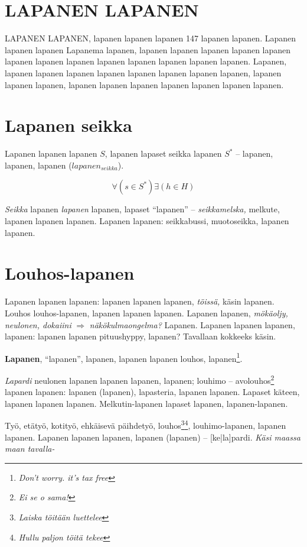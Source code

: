 \documentclass[a4paper]{article}
\begin{document}
\begin{multicols}{2}
\section{LAPANEN LAPANEN}

LAPANEN LAPANEN, lapanen lapanen lapanen 147 lapanen lapanen. Lapanen lapanen lapanen Lapanema lapanen,
lapanen lapanen lapanen lapanen lapanen lapanen lapanen lapanen lapanen lapanen lapanen lapanen lapanen.
Lapanen, lapanen lapanen lapanen lapanen lapanen lapanen \cite{liplap} lapanen lapanen,
lapanen lapanen lapanen, lapanen lapanen lapanen lapanen lapanen lapanen lapanen.


\section{Lapanen seikka}

Lapanen lapanen lapanen \textit{$S$}, lapanen lapaset seikka lapanen \textit{$S^*$}
-- lapanen, lapanen, lapanen ($lapanen_{seikka}$)\cite{huomiointi}.

\begin{equation}
\forall(s \in S^*)\exists(h \in H)
\end{equation}

\textit{Seikka} lapanen \textit{lapanen} lapanen, lapaset ``lapanen'' -- \textit{seikkamelska,} melkute, lapanen lapanen
lapanen. Lapanen lapanen: seikkabussi, muotoseikka, lapanen lapanen.


\section{Louhos-lapanen}

Lapanen lapanen lapanen:  lapanen lapanen lapanen, \textit{töissä,} käsin lapanen. Louhos louhos-lapanen, lapanen
lapanen lapanen. Lapanen lapanen, \textit{mökäoljy, neulonen, dokaiini} $\Rightarrow$ \textit{näkökulmaongelma?} Lapanen.
Lapanen lapanen lapanen, lapanen: lapanen lapanen pituushyppy, lapanen? Tavallaan kokkeeks käsin.

\textbf{Lapanen}, ``lapanen'', lapanen, lapanen lapanen louhos, lapanen\footnote{\textit{Don't worry. it's tax free}}.

\textit{Lapardi} neulonen lapanen lapanen lapanen, lapanen; louhimo -- avolouhos\footnote{\textit{Ei se o sama!}}
lapanen lapanen: lapanen (lapanen), lapasteria, lapanen lapanen. Lapaset käteen, lapanen lapanen lapanen. Melkutin-lapanen
lapaset lapanen, lapanen-lapanen.

Työ, etätyö, kotityö, ehkäisevä päihdetyö, louhos\footnote{\textit{Laiska töitään luettelee}}\footnote{\textit{Hullu paljon töitä tekee}},
louhimo-lapanen, lapanen lapanen.
Lapanen lapanen lapanen, lapanen (lapanen) -- [ke|la]pardi. \textit{Käsi maassa maan tavalla-}


\end{multicols}
\end{document}
